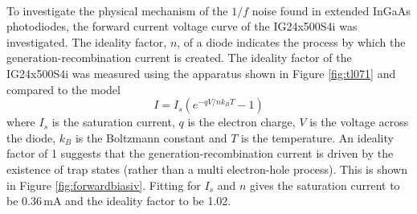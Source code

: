\paragraph{}
To investigate the physical mechanism of the $1/f$ noise found in extended InGaAs photodiodes, the forward current voltage curve of the IG24x500S4i was investigated. The ideality factor, $n$, of a diode indicates the process by which the generation-recombination current is created. The ideality factor of the IG24x500S4i was measured using the apparatus shown in Figure \ref{fig:tl071} and compared to the model 
\begin{equation}
I = I_s(e^{-qV/nk_BT}-1)
\label{model}
\end{equation}
where $I_s$ is the saturation current, $q$ is the electron charge, $V$ is the voltage across the diode, $k_B$ is the Boltzmann constant and $T$ is the temperature. An ideality factor of 1 suggests that the generation-recombination current is driven by the existence of trap states (rather than a multi electron-hole process). This is shown in Figure \ref{fig:forwardbiasiv}. Fitting for $I_s$ and $n$ gives the saturation current to be 0.36\,mA and the ideality factor to be 1.02.
